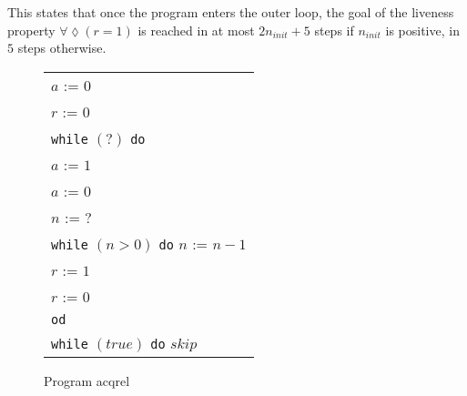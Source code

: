 \documentclass[11pt,a4paper,titlepage]{article}
\theoremstyle{definition}
\begin{document}
This states that once the program enters the outer loop, the goal of the liveness property $\forall\lozenge(r = 1)$ is reached in at most 
$2n_{init} + 5$ steps if $n_{init}$ is positive, in $5$ steps otherwise.

\begin{figure}
    \begin{center}
        \begin{tabular}{l}
            $a$ := $0$ \\
            $r$ := $0$ \\
            \texttt{while} $(?)$ \texttt{do} \\
            \hspace{1em}$a$ := $1$ \\
            \hspace{1em}$a$ := $0$ \\
            \hspace{1em}$n$ := $?$ \\
            \hspace{1em}\texttt{while} $(n > 0)$ \texttt{do} $n$ := $n - 1$ \\
            \hspace{1em}$r$ := $1$ \\
            \hspace{1em}$r$ := $0$ \\
            \texttt{od}\\
            \texttt{while} $(true)$ \texttt{do} $skip$ \\
        \end{tabular}
    \end{center}
    \vspace{-1em}
    \caption{Program \textsf{acqrel}}
    \label{fig:acqrel}
\end{figure}
\end{document}
